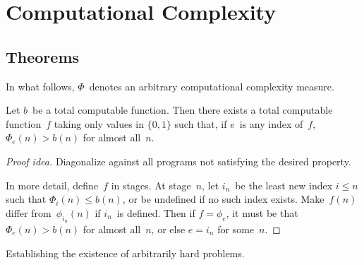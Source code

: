 %
%
%
\section{Computational Complexity}
\subsection*{Theorems}
In what follows, \(\Phi\)~denotes an arbitrary computational complexity measure.

\begin{thm}[Rabin]
Let \(b\)~be a total computable function. Then there exists a total computable function~\(f\) taking only values in \(\{0,1\}\) such that, if \(e\)~is any index of~\(f\), \(\Phi_e(n)>b(n)\) for almost all~\(n\).
\end{thm}
\begin{proof}[Proof idea]
Diagonalize against all programs not satisfying the desired property.

In more detail, define~\(f\) in stages. At stage~\(n\), let \(i_n\)~be the least new index \(i\le n\) such that \(\Phi_i(n)\le b(n)\), or be undefined if no such index exists. Make~\(f(n)\) differ from~\(\phi_{i_n}(n)\) if \(i_n\)~is defined. Then if \(f=\phi_e\), it must be that \(\Phi_e(n)>b(n)\) for almost all~\(n\), or else \(e=i_n\) for some~\(n\).
\end{proof}
\begin{app}
Establishing the existence of arbitrarily hard problems.
\end{app}


